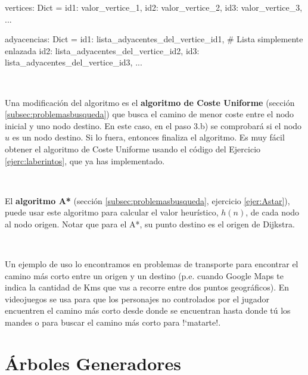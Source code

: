 \begin{pyverbatim}[][frame=single]
vertices: Dict = {id1: valor_vertice_1,
                  id2: valor_vertice_2,
                  id3: valor_vertice_3,
                  ...
                  }
                
adyacencias: Dict = {id1: lista_adyacentes_del_vertice_id1, # Lista simplemente enlazada
                     id2: lista_adyacentes_del_vertice_id2,
                     id3: lista_adyacentes_del_vertice_id3,
                     ...
                     }
\end{pyverbatim}


\

Una modificación del algoritmo es el \textbf{algoritmo de Coste Uniforme} (sección \ref{subsec:problemasbusqueda}) que busca el camino de menor coste entre el nodo inicial y uno nodo destino. En este caso, en el paso 3.b) se comprobará si el nodo $u$ es un nodo destino. Si lo fuera, entonces finaliza el algoritmo. Es muy fácil obtener el algoritmo de Coste Uniforme usando el código del Ejercicio \ref{ejerc:laberintos}, que ya has implementado.

\

El \textbf{algoritmo A*} (sección \ref{subsec:problemasbusqueda}, ejercicio  \ref{ejer:Astar}),  puede usar este algoritmo para calcular el valor heurístico, $h(n)$, de cada nodo al nodo origen. Notar que para el A*, su punto destino es el origen de Dijkstra.

\


Un ejemplo de uso lo encontramos en problemas de transporte para encontrar el camino más corto entre un origen y un destino (p.e. cuando Google Maps te indica la cantidad de Kms que vas a recorre entre dos puntos geográficos). En videojuegos se usa para que los personajes no controlados por el jugador encuentren el camino más corto desde donde se encuentran hasta donde tú los mandes o para buscar el camino más corto para !`matarte!.


%





\separacion
\section{Árboles Generadores} 

